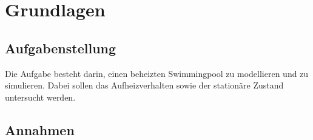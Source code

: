 \section{Grundlagen}
\label{sec:Grundlagen}

\subsection{Aufgabenstellung}
\label{subsec:Aufgabenstellung}
Die Aufgabe besteht darin, einen beheizten Swimmingpool zu modellieren und zu simulieren. Dabei sollen das Aufheizverhalten sowie der stationäre Zustand untersucht werden.

\subsection{Annahmen}
\label{subsec:Annahmen}

